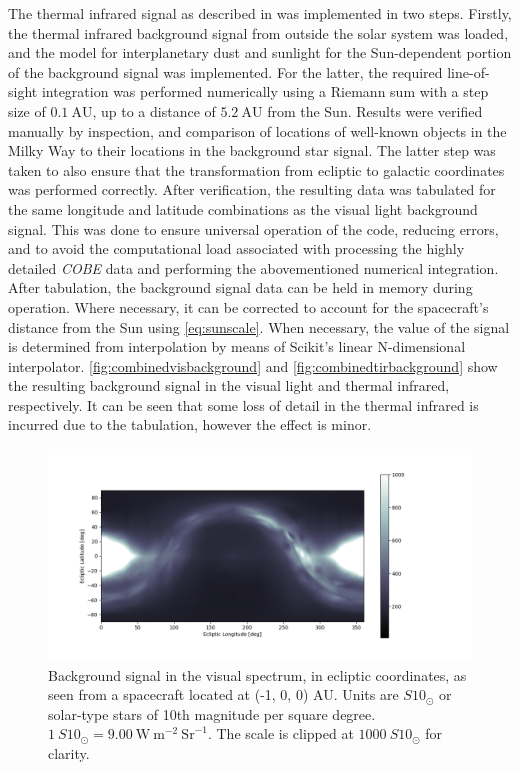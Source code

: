 The thermal infrared signal as described in \cite{IRDust} was implemented in two steps. Firstly, the thermal infrared background signal from outside the solar system was loaded, and the model for interplanetary dust and sunlight for the Sun-dependent portion of the background signal was implemented. For the latter, the required line-of-sight integration was performed numerically using a Riemann sum with a step size of $0.1~\mathrm{AU}$, up to a distance of $5.2~\mathrm{AU}$ from the Sun. Results were verified manually by inspection, and comparison of locations of well-known objects in the Milky Way to their locations in the background star signal. The latter step was taken to also ensure that the transformation from ecliptic to galactic coordinates was performed correctly. After verification, the resulting data was tabulated for the same longitude and latitude combinations as the visual light background signal. This was done to ensure universal operation of the code, reducing errors, and to avoid the computational load associated with processing the highly detailed \textit{COBE} data and performing the abovementioned numerical integration. \\

After tabulation, the background signal data can be held in memory during operation. Where necessary, it can be corrected to account for the spacecraft's distance from the Sun using \autoref{eq:sunscale}. When necessary, the value of the signal is determined from interpolation by means of Scikit's linear N-dimensional interpolator. \autoref{fig:combinedvisbackground} and \autoref{fig:combinedtirbackground} show the resulting background signal in the visual light and thermal infrared, respectively. It can be seen that some loss of detail in the thermal infrared is incurred due to the tabulation, however the effect is minor.

\begin{figure}[htbp]
 \centering
 \includegraphics[width=1.0\textwidth]{img/background_vis_combined.png}
 \caption{Background signal in the visual spectrum, in ecliptic coordinates, as seen from a spacecraft located at (-1, 0, 0) AU. Units are $S10_\odot$ or solar-type stars of 10th magnitude per square degree. $1~S10_\odot = 9.00~\mathrm{W}~\mathrm{m}^{-2}~\mathrm{Sr}^{-1}$. The scale is clipped at $1000 ~S10_\odot$ for clarity.}
 \label{fig:combinedvisbackground}
\end{figure}

